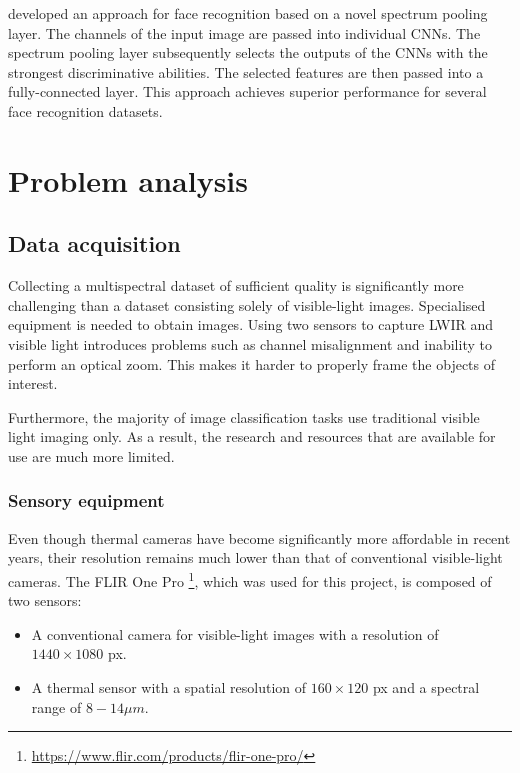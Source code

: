 \documentclass{l4proj}
\begin{document}
\citet{wu_intraspectrum_2020} developed an approach for face recognition based on a novel spectrum pooling layer. The channels of the input image are passed into individual CNNs. The spectrum pooling layer subsequently selects the outputs of the CNNs with the strongest discriminative abilities. The selected features are then passed into a fully-connected layer. This approach achieves superior performance for several face recognition datasets.


\chapter{Problem analysis}
\label{analysis}

\section{Data acquisition}

Collecting a multispectral dataset of sufficient quality is significantly more challenging than a dataset consisting solely of visible-light images. Specialised equipment is needed to obtain images. Using two sensors to capture LWIR and visible light introduces problems such as channel misalignment and inability to perform an optical zoom. This makes it harder to properly frame the objects of interest.

Furthermore, the majority of image classification tasks use traditional visible light imaging only. As a result, the research and resources that are available for use are much more limited.

\subsection{Sensory equipment}
\label{sensory_equipment}

Even though thermal cameras have become significantly more affordable in recent years, their resolution remains much lower than that of conventional visible-light cameras. The FLIR One Pro \footnote{\url{https://www.flir.com/products/flir-one-pro/}}, which was used for this project, is composed of two sensors:

\begin{itemize}
  \item A conventional camera for visible-light images with a resolution of $1440 \times 1080$ px.
  \item A thermal sensor with a spatial resolution of $160 \times 120$ px and a spectral range of $8 - 14 \mu m$.
\end{itemize}
\end{document}
